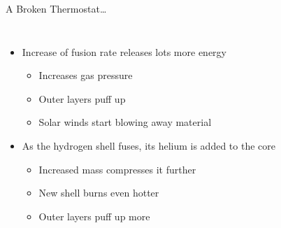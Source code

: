 \documentclass[pdf, aspectratio=169]{beamer}
\begin{document}
\begin{frame}{A Broken Thermostat\ldots}
  \begin{columns}
	\begin{itemize}
	  \item Increase of fusion rate releases lots more energy
		\begin{itemize}
		  \item Increases gas pressure
		  \item Outer layers puff up
		  \item Solar winds start blowing away material
		\end{itemize}
	  \item<2-> As the hydrogen shell fuses, its helium is added to the core
		\begin{itemize}
		  \item Increased mass compresses it further
		  \item New shell burns even hotter
		  \item Outer layers puff up more
		\end{itemize}
	\end{itemize}
  \end{columns}
\end{frame}
\end{document}
